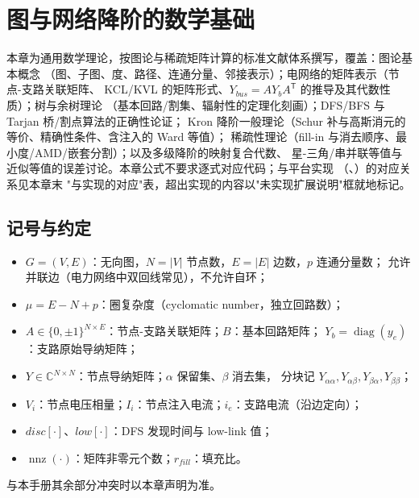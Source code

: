 
\section{图与网络降阶的数学基础}\label{sec:gr-th-foundations}

\begin{theorynote}
本章为通用数学理论，按图论与稀疏矩阵计算的标准文献体系撰写，覆盖：图论基本概念
（图、子图、度、路径、连通分量、邻接表示）；电网络的矩阵表示（节点-支路关联矩阵、
KCL/KVL 的矩阵形式、$Y_{bus}=AY_bA^{\mathsf T}$ 的推导及其代数性质）；树与余树理论
（基本回路/割集、辐射性的定理化刻画）；DFS/BFS 与 Tarjan 桥/割点算法的正确性论证；
Kron 降阶一般理论（Schur 补与高斯消元的等价、精确性条件、含注入的 Ward 等值）；
稀疏性理论（fill-in 与消去顺序、最小度/AMD/嵌套分割）；以及多级降阶的映射复合代数、
星-三角/串并联等值与近似等值的误差讨论。本章公式不要求逐式对应代码；与平台实现
（、）的对应关系见本章末
"与实现的对应"表，超出实现的内容以"未实现扩展说明"框就地标记。
\end{theorynote}

\subsection{记号与约定}
\begin{itemize}
  \item $G=(V,E)$：无向图，$N=|V|$ 节点数，$E=|E|$ 边数，$p$ 连通分量数；
        允许并联边（电力网络中双回线常见），不允许自环；
  \item $\mu=E-N+p$：圈复杂度（cyclomatic number，独立回路数）；
  \item $A\in\{0,\pm1\}^{N\times E}$：节点-支路关联矩阵；$B$：基本回路矩阵；
        $Y_b=\operatorname{diag}(y_e)$：支路原始导纳矩阵；
  \item $Y\in\mathbb C^{N\times N}$：节点导纳矩阵；$\alpha$ 保留集、$\beta$ 消去集，
        分块记 $Y_{\alpha\alpha},Y_{\alpha\beta},Y_{\beta\alpha},Y_{\beta\beta}$；
  \item $V_i$：节点电压相量；$I_i$：节点注入电流；$i_e$：支路电流（沿边定向）；
  \item $disc[\cdot]$、$low[\cdot]$：DFS 发现时间与 low-link 值；
  \item $\operatorname{nnz}(\cdot)$：矩阵非零元个数；$r_{fill}$：填充比。
\end{itemize}
与本手册其余部分冲突时以本章声明为准。

